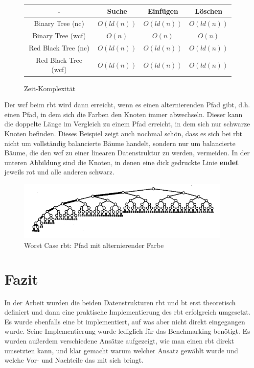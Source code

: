 \documentclass[11pt]{article}
\begin{document}
\begin{figure}[h]
  \centering  
  \caption{Zeit-Komplexität}
  \begin{tabular}{|c|c|c|c|} 
    \hline
    - & Suche & Einfügen & Löschen \\ 
    \hline
    Binary Tree (\gls{nc}) & $O(ld(n))$ & $O(ld(n))$ & $O(ld(n))$ \\ 
    \hline
    Binary Tree (\gls{wcf}) & $O(n)$ & $O(n)$ & $O(n)$ \\ 
    \hline
    Red Black Tree (\gls{nc}) & $O(ld(n))$ & $O(ld(n))$ & $O(ld(n))$ \\ 
    \hline
    Red Black Tree (\gls{wcf}) & $O(ld(n))$ & $O(ld(n))$ & $O(ld(n))$ \\ 
    \hline
  \end{tabular}
\end{figure}

Der \gls{wcf} beim \gls{rbt} wird dann erreicht, wenn es einen alternierenden Pfad gibt, d.h. einen Pfad, in dem sich die Farben den Knoten immer abwechseln.
Dieser kann die doppelte Länge im Vergleich zu einem Pfad erreicht, in dem sich nur schwarze Knoten befinden.
Dieses Beispiel zeigt auch nochmal schön, dass es sich bei \gls{rbt} nicht um vollständig balancierte Bäume handelt, sondern nur um balancierte Bäume, die den \gls{wcf} zu einer linearen Datenstruktur zu werden, vermeiden.
In der unteren Abbildung sind die Knoten, in denen eine dick gedruckte Linie \textbf{endet} jeweils rot und alle anderen schwarz.  

\begin{figure}[h]
  \centering
  \includegraphics[width=400px]{worst_case.png}
  \caption{Worst Case \gls{rbt}: Pfad mit alternierender Farbe}
\end{figure}
\cite[S. 228]{aic}

\pagebreak
\section{Fazit}

In der Arbeit wurden die beiden Datenstrukturen \gls{rbt} und \gls{bt} erst theoretisch definiert 
und dann eine praktische Implementierung des \gls{rbt} erfolgreich umgesetzt. Es wurde ebenfalls eine \gls{bt} implementiert, 
auf was aber nicht direkt eingegangen wurde. Seine Implementierung wurde lediglich für das Benchmarking benötigt.
Es wurden außerdem verschiedene Ansätze aufgezeigt, wie man einen \gls{rbt} direkt umsetzten kann, und klar gemacht warum welcher Ansatz gewählt wurde und welche Vor- und Nachteile das mit sich bringt.
\end{document}
